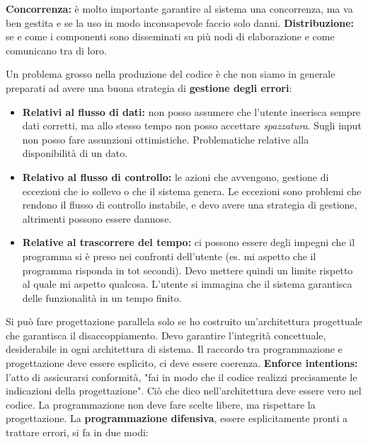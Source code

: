 \textbf{Concorrenza:} è molto importante garantire al sistema una concorrenza, ma va ben gestita e se la uso in modo inconsapevole faccio solo danni.
\textbf{Distribuzione:} se e come i componenti sono disseminati su più nodi di elaborazione e come comunicano tra di loro.


Un problema grosso nella produzione del codice è che non siamo in generale preparati ad avere una buona strategia di \textbf{gestione degli errori}:

\begin{itemize}
	\item \textbf{Relativi al flusso di dati:} non posso assumere che l'utente inserisca sempre dati corretti, ma allo stesso tempo non posso accettare \textit{spazzatura}. Sugli input non posso fare assunzioni ottimistiche. Problematiche relative alla disponibilità di un dato.
	\item \textbf{Relativo al flusso di controllo:} le azioni che avvengono, gestione di eccezioni che io sollevo o che il sistema genera. Le eccezioni sono problemi che rendono il flusso di controllo instabile, e devo avere una strategia di gestione, altrimenti possono essere dannose.
	\item \textbf{Relative al trascorrere del tempo:} ci possono essere degli impegni che il programma si è preso nei confronti dell'utente (es. mi aspetto che il programma risponda in tot secondi). Devo mettere quindi un limite rispetto al quale mi aspetto qualcosa. L'utente si immagina che il sistema garantisca delle funzionalità in un tempo finito.
\end{itemize}

Si può fare progettazione parallela solo se ho costruito un'architettura progettuale che garantisca il disaccoppiamento. Devo garantire l'integrità concettuale, desiderabile in ogni architettura di sistema. Il raccordo tra programmazione e progettazione deve essere esplicito, ci deve essere coerenza. \textbf{Enforce intentions:} l'atto di assicurarsi conformità, "fai in modo che il codice realizzi precisamente le indicazioni della progettazione". Ciò che dico nell'architettura deve essere vero nel codice. La programmazione non deve fare scelte libere, ma rispettare la progettazione. La \textbf{programmazione difensiva}, essere esplicitamente pronti a trattare errori, si fa in due modi:

